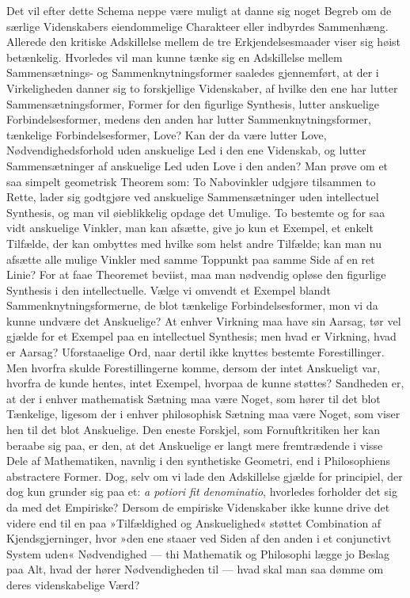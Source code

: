 \documentclass[12pt]{book}
\newcommand{\apage}[1]{\marginnote{\footnotesize\textit{[#1]}}}
\begin{document}
Det vil efter dette Schema neppe være muligt at danne sig noget Begreb om
de særlige Videnskabers eiendommelige Charakteer eller indbyrdes
Sammenhæng. Allerede den kritiske Adskillelse mellem de tre
Erkjendelsesmaader viser sig høist betænkelig. Hvorledes vil man kunne
tænke sig en Adskillelse mellem Sammensætnings- og Sammenknytningsformer
saaledes gjennemført, at der i Virkeligheden danner sig to forskjellige
Videnskaber, af hvilke den ene har lutter Sammensætningsformer, Former for
den figurlige Synthesis, lutter anskuelige Forbindelsesformer, medens den
anden har lutter Sammenknytningsformer, tænkelige Forbindelsesformer, Love?
Kan der da være lutter Love, Nødvendighedsforhold uden anskuelige Led i den
ene Videnskab, og lutter Sammensætninger af anskuelige Led uden Love i \apage{84} den
anden? Man prøve om et saa simpelt geometrisk Theorem som: To Nabovinkler
udgjøre tilsammen to Rette, lader sig godtgjøre ved anskuelige
Sammensætninger uden intellectuel Synthesis, og man vil øieblikkelig
opdage det Umulige. To bestemte og for saa vidt anskuelige Vinkler, man kan
afsætte, give jo kun et Exempel, et enkelt Tilfælde, der kan ombyttes med
hvilke som helst andre Tilfælde; kan man nu afsætte alle mulige Vinkler med
samme Toppunkt paa samme Side af en ret Linie? For at faae Theoremet
beviist, maa man nødvendig opløse den figurlige Synthesis i den
intellectuelle. Vælge vi omvendt et Exempel blandt Sammenknytningsformerne,
de blot tænkelige Forbindelsesformer, mon vi da kunne undvære det
Anskuelige? At enhver Virkning maa have sin Aarsag, tør vel gjælde for et
Exempel paa en intellectuel Synthesis; men hvad er Virkning, hvad er
Aarsag? Uforstaaelige Ord, naar dertil ikke knyttes bestemte Forestillinger.
Men hvorfra skulde Forestillingerne komme, dersom der intet Anskueligt var,
hvorfra de kunde hentes, intet Exempel, hvorpaa de kunne støttes? Sandheden
er, at der i enhver mathematisk Sætning maa være Noget, som hører til det
blot Tænkelige, ligesom der i enhver philosophisk Sætning maa være Noget,
som viser hen til det blot Anskuelige. Den eneste Forskjel, som
Fornuftkritiken her kan beraabe sig paa, er den, at det Anskuelige er langt
mere fremtrædende i visse Dele af Mathematiken, navnlig i den synthetiske
Geometri, end i Philosophiens abstractere Former. Dog, selv om vi lade den
Adskillelse gjælde for principiel, \apage{85} der dog kun grunder sig paa et:
\emph{a potiori fit denominatio}, hvorledes forholder det sig da med det
Empiriske? Dersom de empiriske Videnskaber ikke kunne drive det videre end
til en paa »Tilfældighed og Anskuelighed« støttet Combination af
Kjendsgjerninger, hvor »den ene staaer ved Siden af den anden i et
conjunctivt System uden« Nødvendighed --- thi Mathematik og Philosophi
lægge jo Beslag paa Alt, hvad der hører Nødvendigheden til --- hvad skal
man saa dømme om deres videnskabelige Værd?
\end{document}
